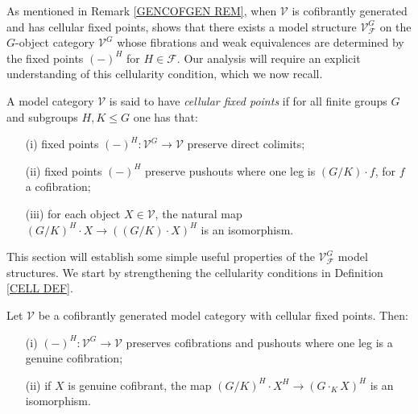 \documentclass[a4paper,10pt]{article}%
\begin{document}
As mentioned in Remark \ref{GENCOFGEN REM},
when $\mathcal{V}$ is cofibrantly generated and has cellular fixed points,
\cite[Prop. 2.6]{Ste16} shows that there exists a model structure
$\mathcal{V}^{G}_{\mathcal{F}}$
on the $G$-object category
$\mathcal{V}^G$
whose fibrations and weak equivalences are determined by the fixed points $(\minus)^H$ for $H \in \mathcal{F}$.
Our analysis will require an explicit understanding of this cellularity condition,
which we now recall.

\begin{definition}\label{CELL DEF}
	A model category $\mathcal{V}$ is said to have 
	\textit{cellular fixed points} if for all finite groups $G$ and subgroups $H,K\leq G$ one has that:
\begin{itemize}
	\item[(i)] fixed points $(\minus)^H \colon \mathcal{V}^G \to \mathcal{V}$ preserve direct colimits;
	\item[(ii)] fixed points $(\minus)^H$ preserve pushouts where one leg is $(G/K)\cdot f$, for $f$ a cofibration;
	\item[(iii)] for each object $X \in \mathcal{V}$, the natural map 
	$(G/K)^H \cdot X \to ((G/K) \cdot X)^H$
	is an isomorphism.
\end{itemize}
\end{definition}


This section will establish some simple useful properties of the $\mathcal{V}^G_{\mathcal{F}}$ model structures. We start by strengthening the 
cellularity conditions in Definition \ref{CELL DEF}.

\begin{proposition}\label{STRONGCELL PROP}
	Let $\mathcal{V}$ be a cofibrantly generated model category with cellular fixed points. Then:
	\begin{itemize}
		\item[(i)] $(\minus)^H \colon \mathcal{V}^G \to \mathcal{V}$ preserves cofibrations and pushouts where one leg
			 is a genuine cofibration;
		\item[(ii)] if $X$ is genuine cofibrant, the map 
			$(G/K)^H \cdot X^H \to (G \cdot_K X)^H$ is an isomorphism.
	\end{itemize}
\end{proposition}
\end{document}
